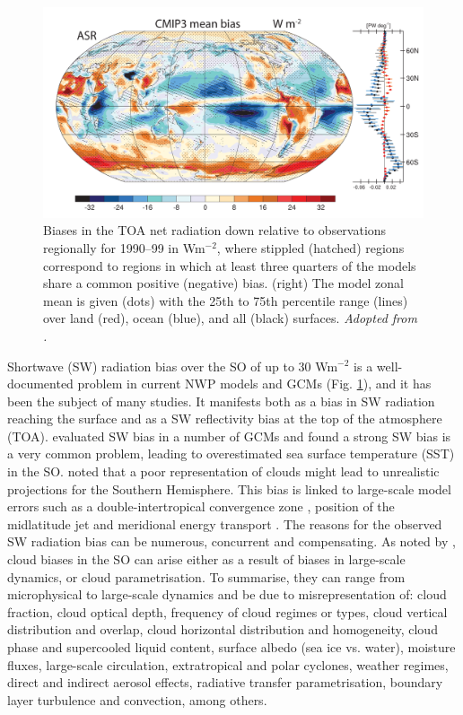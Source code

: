 \begin{figure}[t]
\centering
\includegraphics[width=\textwidth]{fig/trenberth-fassulo-sw-bias.png}
\caption[Biases in the TOA net radiation down]{
Biases in the TOA net radiation down relative to observations regionally for
1990--99
in Wm$^{-2}$, where stippled (hatched) regions correspond to regions
in which at least three quarters of the models share a common
positive (negative) bias. (right) The model zonal mean is given
(dots) with the 25th to 75th percentile range (lines) over land (red),
ocean (blue), and all (black) surfaces. \textit{Adopted from
\cite{trenberth2010}.}
}
\label{fig:1:trenberth-fassulo-sw-bias}
\end{figure}

Shortwave (SW) radiation bias over the SO of up to 30 Wm$^{-2}$ is a
well-documented problem in current NWP models and GCMs
\citep{trenberth2010} (Fig. \ref{fig:1:trenberth-fassulo-sw-bias}),
and it has been the subject of many studies.
It manifests both as a bias in SW radiation reaching the surface and as a
SW reflectivity bias at the top of the atmosphere (TOA).
\cite{bodas-salcedo2014} evaluated SW bias in a number
of GCMs and found a strong SW bias is a very common problem, leading to
overestimated sea surface temperature (SST) in the SO.
\cite{trenberth2010} noted that a poor representation of clouds might lead to
unrealistic projections for the Southern Hemisphere. This bias is linked to
large-scale model errors such as a double-intertropical
convergence zone \citep{hwang2013}, position of the midlatitude jet and
meridional energy transport \citep{mason2014}.
The reasons for the observed SW radiation bias
can be numerous, concurrent and compensating.
As noted by \cite{kelleher2019}, cloud biases in the SO can arise either
as a result of biases in large-scale dynamics, or cloud parametrisation.
To summarise, they can range
from microphysical to large-scale dynamics and be due to misrepresentation of:
cloud fraction, cloud optical depth, frequency of cloud regimes or types,
cloud vertical distribution and overlap, cloud horizontal distribution
and homogeneity, cloud phase and supercooled liquid content, surface albedo
(sea ice vs. water), moisture fluxes, large-scale circulation, extratropical
and polar cyclones, weather regimes, direct and indirect aerosol effects,
radiative transfer parametrisation, boundary layer turbulence and convection,
among others.

